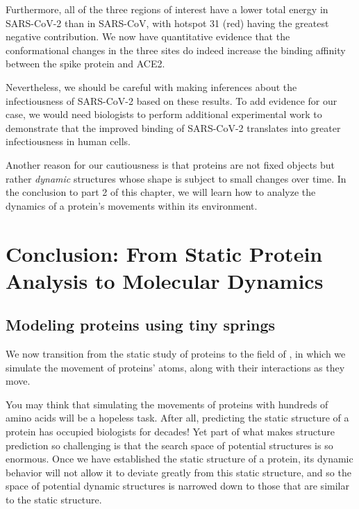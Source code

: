 Furthermore, all of the three regions of interest have a lower total energy in SARS-CoV-2 than in SARS-CoV, with hotspot 31 (red) having the greatest negative contribution. We now have quantitative evidence that the conformational changes in the three sites do indeed increase the binding affinity between the spike protein and ACE2.

Nevertheless, we should be careful with making inferences about the infectiousness of SARS-CoV-2 based on these results. To add evidence for our case, we would need biologists to perform additional experimental work to demonstrate that the improved binding of SARS-CoV-2 translates into greater infectiousness in human cells.

Another reason for our cautiousness is that proteins are not fixed objects but rather \textit{dynamic} structures whose shape is subject to small changes over time. In the conclusion to part 2 of this chapter, we will learn how to analyze the dynamics of a protein's movements within its environment.\\

\FloatBarrier
{}

\section{Conclusion: From Static Protein Analysis to Molecular Dynamics}
\label{sec:conclusion_part_2}
\subsection{Modeling proteins using tiny springs}

We now transition from the static study of proteins to the field of , in which we simulate the movement of proteins' atoms, along with their interactions as they move.

You may think that simulating the movements of proteins with hundreds of amino acids will be a hopeless task. After all, predicting the static structure of a protein has occupied biologists for decades! Yet part of what makes structure prediction so challenging is that the search space of potential structures is so enormous. Once we have established the static structure of a protein, its dynamic behavior will not allow it to deviate greatly from this static structure, and so the space of potential dynamic structures is narrowed down to those that are similar to the static structure.

